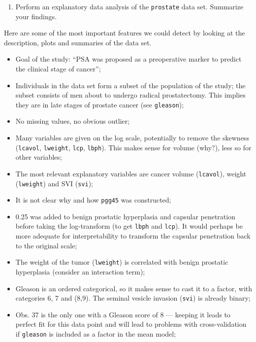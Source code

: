 \documentclass[]{book}
\providecommand{\tightlist}{%
  \setlength{\itemsep}{0pt}\setlength{\parskip}{0pt}}
\theoremstyle{definition}
\theoremstyle{definition}
\theoremstyle{definition}
\theoremstyle{remark}
\begin{document}
\begin{enumerate}
\def\labelenumi{\alph{enumi}.}
\setcounter{enumi}{9}
\tightlist
\item
  Perform an explanatory data analysis of the \texttt{prostate} data
  set. Summarize your findings.
\end{enumerate}

Here are some of the most important features we could detect by looking
at the description, plots and summaries of the data set.

\begin{itemize}
\tightlist
\item
  Goal of the study: ``PSA was proposed as a preoperative marker to
  predict the clinical stage of cancer'';
\item
  Individuals in the data set form a subset of the population of the
  study; the subset consists of men about to undergo radical
  prostatectomy. This implies they are in late stages of prostate cancer
  (see \texttt{gleason});
\item
  No missing values, no obvious outlier;
\item
  Many variables are given on the log scale, potentially to remove the
  skewness (\texttt{lcavol}, \texttt{lweight}, \texttt{lcp},
  \texttt{lbph}). This makes sense for volume (why?), less so for other
  variables;
\item
  The most relevant explanatory variables are cancer volume
  (\texttt{lcavol}), weight (\texttt{lweight}) and SVI (\texttt{svi});
\item
  It is not clear why and how \texttt{pgg45} was constructed;
\item
  0.25 was added to benign prostatic hyperplasia and capsular
  penetration before taking the log-transform (to get \texttt{lbph} and
  \texttt{lcp}). It would perhaps be more adequate for interpretability
  to transform the capsular penetration back to the original scale;
\item
  The weight of the tumor (\texttt{lweight}) is correlated with benign
  prostatic hyperplasia (consider an interaction term);
\item
  Gleason is an ordered categorical, so it makes sense to cast it to a
  factor, with categories 6, 7 and (8,9). The seminal vesicle invasion
  (\texttt{svi}) is already binary;
\item
  Obs. 37 is the only one with a Gleason score of 8 --- keeping it leads
  to perfect fit for this data point and will lead to problems with
  cross-validation if \texttt{gleason} is included as a factor in the
  mean model;
\end{itemize}
\end{document}
